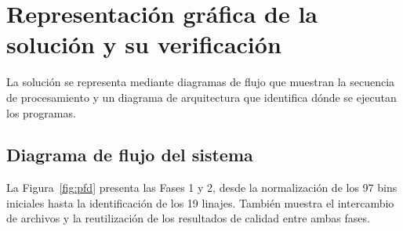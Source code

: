\section{Representación gráfica de la solución y su verificación}

La solución se representa mediante diagramas de flujo que muestran la secuencia de procesamiento 
y un diagrama de arquitectura que identifica dónde se ejecutan los programas.

\subsection{Diagrama de flujo del sistema}

La Figura~\ref{fig:pfd} presenta las Fases 1 y 2, desde la normalización de los 97 bins 
iniciales hasta la identificación de los 19 linajes. También muestra el intercambio de archivos 
y la reutilización de los resultados de calidad entre ambas fases.

